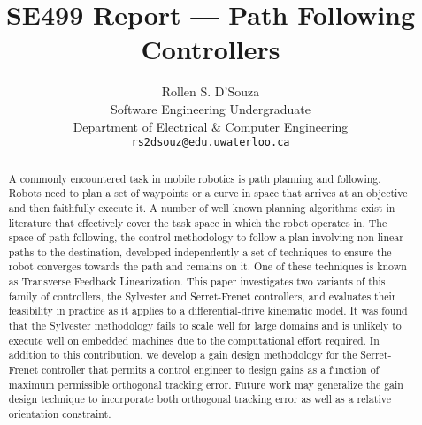 \documentclass[11pt]{article}
\author{{Rollen S. D'Souza}\\
        {Software Engineering Undergraduate}\\
        {Department of Electrical \& Computer Engineering}\\
        {\texttt{rs2dsouz@edu.uwaterloo.ca}}}
\title{\textbf{SE499 Report --- Path Following Controllers}}
\date{}
\begin{document}
\maketitle
\begin{abstract}
A commonly encountered task in mobile robotics is path planning and following. Robots need to plan a set of waypoints or a curve in space that arrives at an objective and then faithfully execute it. A number of well known planning algorithms exist in literature that effectively cover the task space in which the robot operates in. The space of path following, the control methodology to follow a plan involving non-linear paths to the destination, developed independently a set of techniques to ensure the robot converges towards the path and remains on it. One of these techniques is known as Transverse Feedback Linearization. This paper investigates two variants of this family of controllers, the Sylvester and Serret-Frenet controllers, and evaluates their feasibility in practice as it applies to a differential-drive kinematic model. It was found that the Sylvester methodology fails to scale well for large domains and is unlikely to execute well on embedded machines due to the computational effort required. In addition to this contribution, we develop a gain design methodology for the Serret-Frenet controller that permits a control engineer to design gains as a function of maximum permissible orthogonal tracking error. Future work may generalize the gain design technique to incorporate both orthogonal tracking error as well as a relative orientation constraint.
\end{abstract}
\end{document}
